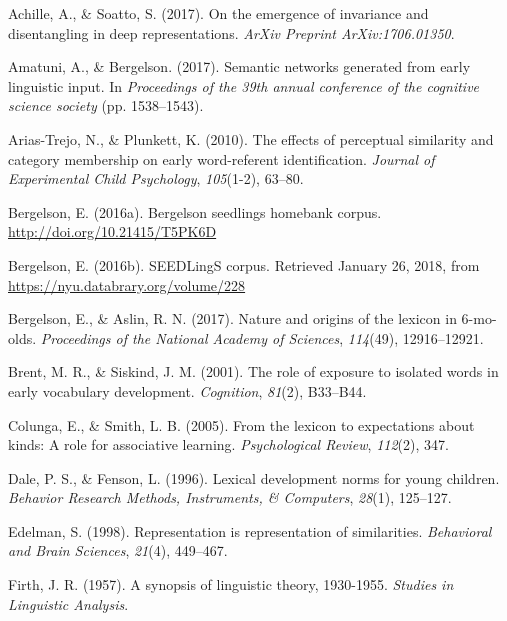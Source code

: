 \documentclass[10pt, letterpaper]{article}
\begin{document}
\setlength{\parindent}{-0.1in} \setlength{\leftskip}{0.125in} \noindent

\hypertarget{refs}{}
\hypertarget{ref-achille2017emergence}{}
Achille, A., \& Soatto, S. (2017). On the emergence of invariance and
disentangling in deep representations. \emph{ArXiv Preprint
ArXiv:1706.01350}.

\hypertarget{ref-amatuni2017semantic}{}
Amatuni, A., \& Bergelson. (2017). Semantic networks generated from
early linguistic input. In \emph{Proceedings of the 39th annual
conference of the cognitive science society} (pp. 1538--1543).

\hypertarget{ref-arias2010effects}{}
Arias-Trejo, N., \& Plunkett, K. (2010). The effects of perceptual
similarity and category membership on early word-referent
identification. \emph{Journal of Experimental Child Psychology},
\emph{105}(1-2), 63--80.

\hypertarget{ref-bergelson2016seedlings}{}
Bergelson, E. (2016a). Bergelson seedlings homebank corpus.
\url{http://doi.org/10.21415/T5PK6D}

\hypertarget{ref-bergelson2016seedlingsdatabrary}{}
Bergelson, E. (2016b). SEEDLingS corpus. Retrieved January 26, 2018,
from \url{https://nyu.databrary.org/volume/228}

\hypertarget{ref-bergelson2017nature}{}
Bergelson, E., \& Aslin, R. N. (2017). Nature and origins of the lexicon
in 6-mo-olds. \emph{Proceedings of the National Academy of Sciences},
\emph{114}(49), 12916--12921.

\hypertarget{ref-brent2001role}{}
Brent, M. R., \& Siskind, J. M. (2001). The role of exposure to isolated
words in early vocabulary development. \emph{Cognition}, \emph{81}(2),
B33--B44.

\hypertarget{ref-colunga2005lexicon}{}
Colunga, E., \& Smith, L. B. (2005). From the lexicon to expectations
about kinds: A role for associative learning. \emph{Psychological
Review}, \emph{112}(2), 347.

\hypertarget{ref-dale1996lexical}{}
Dale, P. S., \& Fenson, L. (1996). Lexical development norms for young
children. \emph{Behavior Research Methods, Instruments, \& Computers},
\emph{28}(1), 125--127.

\hypertarget{ref-edelman1998representation}{}
Edelman, S. (1998). Representation is representation of similarities.
\emph{Behavioral and Brain Sciences}, \emph{21}(4), 449--467.

\hypertarget{ref-firth1957synopsis}{}
Firth, J. R. (1957). A synopsis of linguistic theory, 1930-1955.
\emph{Studies in Linguistic Analysis}.
\end{document}
